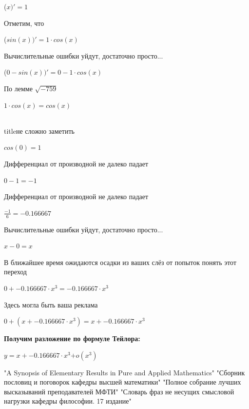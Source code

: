 \documentclass[12pt,a4paper,fleqn]{article}
\begin{document}
\begin{center}
 ($x)'
  = 1$\end{center}
Отметим, что

\begin{center}
 ($sin(x))'
  = 1 \cdot cos(x)$\end{center}
Вычислительные ошибки уйдут, достаточно просто...

\begin{center}
 ($0-sin(x))'
  = 0-1 \cdot cos(x)$\end{center}
По лемме $\sqrt{-759}$
\begin{center}
$1 \cdot cos(x) = cos(x)$\end{center}
\\ title{не сложно заметить} 

\begin{center}
\end{center}
\begin{center}$cos(0) = 1$\end{center}
Дифференциал от производной не далеко падает\cite{link2}

\begin{center}
\end{center}
\begin{center}$0-1 = -1$\end{center}
Дифференциал от производной не далеко падает\cite{link2}

\begin{center}
\end{center}
\begin{center}$\frac{-1}{6} = -0.166667$\end{center}
Вычислительные ошибки уйдут, достаточно просто...

\begin{center}
$x-0 = x$\end{center}
В ближайшее время ожидаются осадки из ваших слёз от попыток понять этот переход

\begin{center}
$0+-0.166667 \cdot x^{3} = -0.166667 \cdot x^{3}$\end{center}
Здесь могла быть ваша реклама

\begin{center}
$0+(x+-0.166667 \cdot x^{3}) = x+-0.166667 \cdot x^{3}$\end{center}
\textbf{\LARGE{Получим разложение по формуле Тейлора:}}
\begin{center}
$y = $$x+-0.166667 \cdot x^{3}$$ + o(x^{3})$
\end{center}
\newpage\begin{thebibliography}{}
  "A Synopsis of Elementary Results in Pure and Applied Mathematics"
  "Сборник пословиц и поговорок кафедры высшей математики"
  "Полное собрание лучших высказываний преподавателей МФТИ"
  "Словарь фраз не несущих смысловой нагрузки кафедры философии. 17 издание"
\end{thebibliography}
\end{document}
